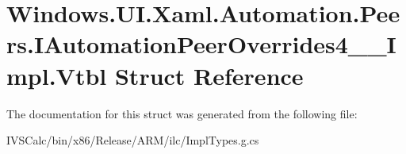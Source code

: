 \hypertarget{struct_windows_1_1_u_i_1_1_xaml_1_1_automation_1_1_peers_1_1_i_automation_peer_overrides4_____impl_1_1_vtbl}{}\section{Windows.\+U\+I.\+Xaml.\+Automation.\+Peers.\+I\+Automation\+Peer\+Overrides4\+\_\+\+\_\+\+Impl.\+Vtbl Struct Reference}
\label{struct_windows_1_1_u_i_1_1_xaml_1_1_automation_1_1_peers_1_1_i_automation_peer_overrides4_____impl_1_1_vtbl}


The documentation for this struct was generated from the following file\+:\begin{DoxyCompactItemize}
\item 
I\+V\+S\+Calc/bin/x86/\+Release/\+A\+R\+M/ilc/Impl\+Types.\+g.\+cs\end{DoxyCompactItemize}
